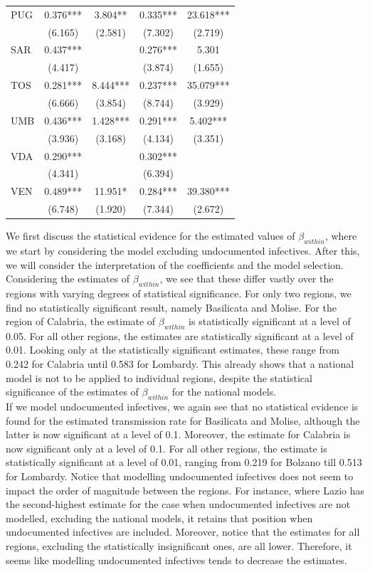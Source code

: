 \documentclass[12pt]{article}
\begin{document}
\begin{longtable}{@{}lcccc@{}}
        PUG & 0.376*** & 3.804** & 0.335*** & 23.618*** \\ 
         & (6.165) & (2.581) & (7.302) & (2.719) \\ 
        SAR & 0.437*** &  & 0.276*** & 5.301 \\ 
         & (4.417) &  & (3.874) & (1.655) \\ 
        TOS & 0.281*** & 8.444*** & 0.237*** & 35.079*** \\ 
         & (6.666) & (3.854) & (8.744) & (3.929) \\ 
        UMB & 0.436*** & 1.428*** & 0.291*** & 5.402*** \\ 
         & (3.936) & (3.168) & (4.134) & (3.351) \\ 
        VDA & 0.290*** &  & 0.302*** &  \\ 
         & (4.341) &  & (6.394) &  \\ 
        VEN & 0.489*** & 11.951* & 0.284*** & 39.380*** \\ 
         & (6.748) & (1.920) & (7.344) & (2.672) \\* \bottomrule
	\end{longtable}

    We first discuss the statistical evidence for the estimated values of $\beta_{within}$, where we start by considering the model excluding undocumented infectives. After this, we will consider the interpretation of the coefficients and the model selection. Considering the estimates of $\beta_{within}$, we see that these differ vastly over the regions with varying degrees of statistical significance. For only two regions, we find no statistically significant result, namely Basilicata and Molise. For the region of Calabria, the estimate of $\beta_{within}$ is statistically significant at a level of 0.05. For all other regions, the estimates are statistically significant at a level of 0.01. Looking only at the statistically significant estimates, these range from 0.242 for Calabria until 0.583 for Lombardy. This already shows that a national model is not to be applied to individual regions, despite the statistical significance of the estimates of $\beta_{within}$ for the national models. \\

    If we model undocumented infectives, we again see that no statistical evidence is found for the estimated transmission rate for Basilicata and Molise, although the latter is now significant at a level of 0.1. Moreover, the estimate for Calabria is now significant only at a level of 0.1. For all other regions, the estimate is statistically significant at a level of 0.01, ranging from 0.219 for Bolzano till 0.513 for Lombardy. Notice that modelling undocumented infectives does not seem to impact the order of magnitude between the regions. For instance, where Lazio has the second-highest estimate for the case when undocumented infectives are not modelled, excluding the national models, it retains that position when undocumented infectives are included. Moreover, notice that the estimates for all regions, excluding the statistically insignificant ones, are all lower. Therefore, it seems like modelling undocumented infectives tends to decrease the estimates. \\
\end{document}

